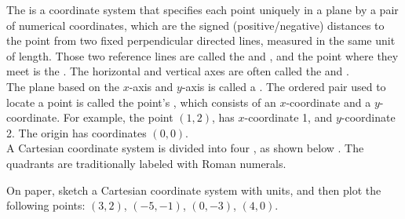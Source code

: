 \documentclass{ximera}
\begin{document}
\begin{definition}
The  is a coordinate system that specifies each point uniquely in a plane by a pair of numerical coordinates, which are the signed (positive/negative) distances to the point from two fixed perpendicular directed lines, measured in the same unit of length. Those two reference lines are called the  and , and the point where they meet is the . The horizontal and vertical axes are often called the  and .  \\

The plane based on the $x$-axis and $y$-axis is called a . The ordered pair used to locate a point is called the point's , which consists of an $x$-coordinate and a $y$-coordinate. For example, the point $(1,2)$, has $x$-coordinate 1,  and $y$-coordinate 2.   The origin has coordinates $(0,0)$. \\

A Cartesian coordinate system is divided into four , as shown below . The quadrants are traditionally labeled with Roman numerals.

\begin{image}
\end{image}

\end{definition}


\begin{example}
On paper, sketch a Cartesian coordinate system with units, and then plot the following points: $(3,2)$, $(-5,-1)$, $(0,-3)$, $(4,0)$.

\begin{explanation} 

\begin{image}
\end{image}

\end{explanation}
\end{example}
\end{document}
